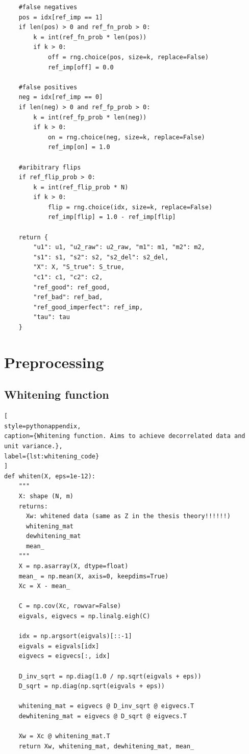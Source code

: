 \begin{lstlisting}
    #false negatives
    pos = idx[ref_imp == 1]
    if len(pos) > 0 and ref_fn_prob > 0:
        k = int(ref_fn_prob * len(pos))
        if k > 0:
            off = rng.choice(pos, size=k, replace=False)
            ref_imp[off] = 0.0

    #false positives
    neg = idx[ref_imp == 0]
    if len(neg) > 0 and ref_fp_prob > 0:
        k = int(ref_fp_prob * len(neg))
        if k > 0:
            on = rng.choice(neg, size=k, replace=False)
            ref_imp[on] = 1.0

    #aribitrary flips
    if ref_flip_prob > 0:
        k = int(ref_flip_prob * N)
        if k > 0:
            flip = rng.choice(idx, size=k, replace=False)
            ref_imp[flip] = 1.0 - ref_imp[flip]

    return {
        "u1": u1, "u2_raw": u2_raw, "m1": m1, "m2": m2,
        "s1": s1, "s2": s2, "s2_del": s2_del,
        "X": X, "S_true": S_true,
        "c1": c1, "c2": c2,
        "ref_good": ref_good,
        "ref_bad": ref_bad,
        "ref_good_imperfect": ref_imp,
        "tau": tau
    }
\end{lstlisting}

\section{Preprocessing}

\subsection{Whitening function}
\label{app:prepro_whitening}

\begin{lstlisting}[
style=pythonappendix,
caption={Whitening function. Aims to achieve decorrelated data and unit variance.},
label={lst:whitening_code}
]
def whiten(X, eps=1e-12):
    """
    X: shape (N, m)
    returns:
      Xw: whitened data (same as Z in the thesis theory!!!!!!)
      whitening_mat
      dewhitening_mat
      mean_
    """
    X = np.asarray(X, dtype=float)
    mean_ = np.mean(X, axis=0, keepdims=True)
    Xc = X - mean_

    C = np.cov(Xc, rowvar=False)
    eigvals, eigvecs = np.linalg.eigh(C)

    idx = np.argsort(eigvals)[::-1]
    eigvals = eigvals[idx]
    eigvecs = eigvecs[:, idx]

    D_inv_sqrt = np.diag(1.0 / np.sqrt(eigvals + eps))
    D_sqrt = np.diag(np.sqrt(eigvals + eps))

    whitening_mat = eigvecs @ D_inv_sqrt @ eigvecs.T
    dewhitening_mat = eigvecs @ D_sqrt @ eigvecs.T

    Xw = Xc @ whitening_mat.T
    return Xw, whitening_mat, dewhitening_mat, mean_
\end{lstlisting}

